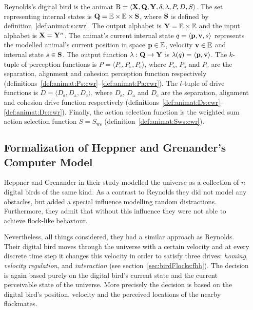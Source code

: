\begin{defn}
\label{def:animat:cwr}
Reynolds's digital bird is the animat ${\mathrm{B}}=\langle{\ensuremath{\mathbf{X}}},{\mathbf{Q}},{\mathbf{Y}},\delta,\lambda,P,D,S\rangle$. The set representing internal states is ${\mathbf{Q}}=\mathbb{E} \times \mathbb{E} \times {\ensuremath{\mathbf{S}}}$, where ${\mathbf{S}}$ is defined by definition~\ref{def:animat:s:cwr}. The output alphabet is ${\mathbf{Y}}=\mathbb{E} \times \mathbb{E}$ and the input alphabet is ${\mathbf{X}}={\mathbf{Y}}^n$. The animat's current internal state $q=\langle{\ensuremath{\mathbf{p}}},{\mathbf{v}},s\rangle$ represents the modelled animal's current position in space ${\mathbf{p}} \in \mathbb{E}$, velocity ${\mathbf{v}} \in \mathbb{E}$ and internal state $s \in {\ensuremath{\mathbf{S}}}$. The output function $\lambda: {\mathbf{Q}} \mapsto {\ensuremath{\mathbf{Y}}}$ is $\lambda(q)=\langle{\ensuremath{\mathbf{p}}},{\mathbf{v}}\rangle$. The $k$-tuple of perception functions is $P=\langle P_\mathrm{s},P_\mathrm{a},P_\mathrm{c}\rangle$, where $P_\mathrm{s}$, $P_\mathrm{a}$ and $P_\mathrm{c}$ are the separation, alignment and cohesion perception function respectively (definitions~\ref{def:animat:Ps:cwr}--\ref{def:animat:Pa:cwr}). The $l$-tuple of drive functions is $D=\langle D_\mathrm{s},D_\mathrm{a},D_\mathrm{c}\rangle$, where $D_\mathrm{s}$, $D_\mathrm{a}$ and $D_\mathrm{c}$ are the separation, alignment and cohesion drive function respectively (definitions~\ref{def:animat:Ds:cwr}--\ref{def:animat:Dc:cwr}). Finally, the action selection function is the weighted sum action selection function $S=S_\mathrm{ws}$ (definition~\ref{def:animat:Sws:cwr}).
\end{defn}

\subsection{Formalization of Heppner and Grenander's Computer Model}
\label{sec:animat:fhh}
Heppner and Grenander in their study \cite{heppner:1990} modelled the universe as a collection of $n$ digital birds of the same kind. As a contrast to Reynolds they did not model any obstacles, but added a special influence modelling random distractions. Furthermore, they admit that without this influence they were not able to achieve flock-like behaviour.

Nevertheless, all things considered, they had a similar approach as Reynolds. Their digital bird moves through the universe with a certain velocity and at every discrete time step it changes this velocity in order to satisfy three drives: \emph{homing}, \emph{velocity regulation}, and \emph{interaction} (see section~\ref{sec:birdFlocks:fhh}). The decision is again based purely on the digital bird's current state and the current perceivable state of the universe. More precisely the decision is based on the digital bird's position, velocity and the perceived locations of the nearby flockmates. 

